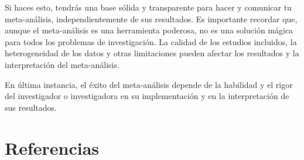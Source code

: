 \documentclass[
  bookmarksnumbered]{article}
\begin{document}
Si haces esto, tendrás una base sólida y transparente para hacer y comunicar tu meta-análisis, independientemente de sus resultados. Es importante recordar que, aunque el meta-análisis es una herramienta poderosa, no es una solución mágica para todos los problemas de investigación. La calidad de los estudios incluidos, la heterogeneidad de los datos y otras limitaciones pueden afectar los resultados y la interpretación del meta-análisis.

En última instancia, el éxito del meta-análisis depende de la habilidad y el rigor del investigador o investigadora en su implementación y en la interpretación de sus resultados.

\hypertarget{referencias}{%
\section{Referencias}\label{referencias}}
\end{document}
